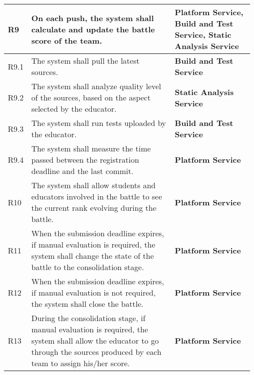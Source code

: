 \begin{center}
\begin{longtable}{|l|p{8cm}|p{5cm}|}
        R9    & On each push, the system shall calculate and update the battle score of the team.                                                                                              & \textbf{Platform Service, Build and Test Service, Static Analysis Service} \\\hline
        R9.1  & The system shall pull the latest sources.                                                                                                                                      & \textbf{Build and Test Service}                                            \\\hline
        R9.2  & The system shall analyze quality level of the sources, based on the aspect selected by the educator.                                                                           & \textbf{Static Analysis Service}                                           \\\hline
        R9.3  & The system shall run tests uploaded by the educator.                                                                                                                           & \textbf{Build and Test Service}                                            \\\hline
        R9.4  & The system shall measure the time passed between the registration deadline and the last commit.                                                                                & \textbf{Platform Service}                                                  \\\hline
        R10   & The system shall allow students and educators involved in the battle to see the current rank evolving during the battle.                                                       & \textbf{Platform Service}                                                  \\\hline
        R11   & When the submission deadline expires, if manual evaluation is required, the system shall change the state of the battle to the consolidation stage.                            & \textbf{Platform Service}                                                  \\\hline
        R12   & When the submission deadline expires, if manual evaluation is not required, the system shall close the battle.                                                                 & \textbf{Platform Service}                                                  \\\hline
        R13   & During the consolidation stage, if manual evaluation is required, the system shall allow the educator to go through the sources produced by each team to assign his/her score. & \textbf{Platform Service}                                                  \\\hline

\end{longtable}
\end{center}
